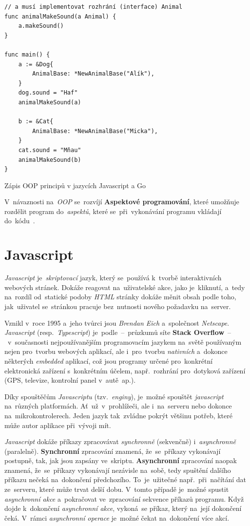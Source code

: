 \documentclass[11pt,a4paper]{report}
\begin{document}
\begin{code}
\begin{minipage}{.48\textwidth}
\begin{verbatim}
// a musí implementovat rozhrání (interface) Animal
func animalMakeSound(a Animal) {
    a.makeSound()
}

func main() {
    a := &Dog{
        AnimalBase: *NewAnimalBase("Alík"),
    }
    dog.sound = "Haf"
    animalMakeSound(a)

    b := &Cat{
        AnimalBase: *NewAnimalBase("Micka"),
    }
    cat.sound = "Mňau"
    animalMakeSound(b)
}
                    \end{verbatim}
                \end{minipage}
                \caption{Zápis OOP principů v jazycích Javascript a Go}
                \label{code:classoop}
            \end{code}

            V~návaznosti na~\emph{OOP} se~rozvíjí \textbf{Aspektové programování}, které umožňuje rozdělit program do~\emph{aspektů}, které se~při~vykonávání programu vkládají do~kódu~\cite{macurova2012:aspektove}.

        \section{Javascript}
            \emph{Javascript} je~\emph{skriptovací} jazyk, který se~používá k~tvorbě interaktivních webových stránek. Dokáže reagovat na~uživatelské akce, jako je~kliknutí, a~tedy na~rozdíl od~statické podoby \emph{HTML} stránky dokáže měnit obsah podle toho, jak~uživatel se~stránkou pracuje bez~nutnosti nového požadavku na~server.

            Vznikl v~roce 1995 a~jeho tvůrci jsou \emph{Brendan Eich} a~společnost \emph{Netscape}. \emph{Javascript} (resp.~\emph{Typescript}) je~podle~--~průzkumů síte \textbf{Stack Overflow}~--~v~současnosti nejpoužívanějším programovacím jazykem na~světě používaným nejen pro~tvorbu webových aplikací, ale i~pro~tvorbu \emph{nativních} a~dokonce některých \emph{embedded} aplikací, což jsou programy určené pro~konkrétní elektronická zařízení s~konkrétním účelem, např.~rozhrání pro~dotyková zařízení (GPS, televize, kontrolní panel v~autě~ap.).

            Díky spouštěčům \emph{Javascriptu} (tzv.~\emph{enginy}), je~možné spouštět \emph{javascript} na~různých platformách. Ať~už~v~prohlížeči, ale i~na~serveru nebo dokonce na~mikrokontrolerech. Jeden jazyk tak~zvládne pokrýt většinu potřeb, které může autor aplikace při~vývoji mít.

            \emph{Javascript} dokáže příkazy zpracovávat \emph{synchronně} (sekvenčně) i~\emph{asynchronně} (paralelně). \textbf{Synchronní} zpracování znamená, že~se~příkazy vykonávají postupně, tak, jak jsou zapsány ve~skriptu. \textbf{Asynchronní} zpracování naopak znamená, že~se~příkazy vykonávají nezávisle na~sobě, tedy spuštění dalšího příkazu nečeká na~dokončení předchozího. To~je~užitečné např.~při~načítání dat ze~serveru, které může trvat delší dobu. V~tomto případě je~možné spustit \emph{asynchronní akce} a~pokračovat ve~zpracování sekvence příkazů programu. Když dojde k~dokončení \emph{asynchronní akce}, vykoná~se příkaz, který na~její dokončení čeká. V~rámci \emph{asynchronní operace} je~možné čekat na~dokončení více akcí.
\end{document}
